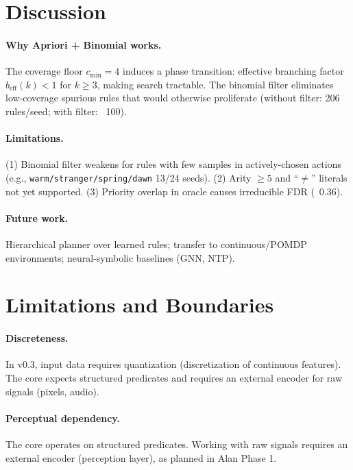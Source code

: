 \documentclass[11pt]{article}
\begin{document}
\section{Discussion}
\label{sec:discussion}

\paragraph{Why Apriori + Binomial works.} The coverage floor $c_{\min}=4$ induces a phase transition: effective branching factor $b_{\text{eff}}(k) < 1$ for $k \geq 3$, making search tractable. The binomial filter eliminates low-coverage spurious rules that would otherwise proliferate (without filter: 206 rules/seed; with filter: ~100).

\paragraph{Limitations.} (1) Binomial filter weakens for rules with few samples in actively-chosen actions (e.g., \texttt{warm/stranger/spring/dawn} 13/24 seeds). (2) Arity $\geq 5$ and ``$\neq$'' literals not yet supported. (3) Priority overlap in oracle causes irreducible FDR (~0.36).

\paragraph{Future work.} Hierarchical planner over learned rules; transfer to continuous/POMDP environments; neural-symbolic baselines (GNN, NTP).


\section{Limitations and Boundaries}
\label{sec:limitations}

\paragraph{Discreteness.} In v0.3, input data requires quantization (discretization of continuous features). The core expects structured predicates and requires an external encoder for raw signals (pixels, audio).

\paragraph{Perceptual dependency.} The core operates on structured predicates. Working with raw signals requires an external encoder (perception layer), as planned in Alan Phase 1.
\end{document}
